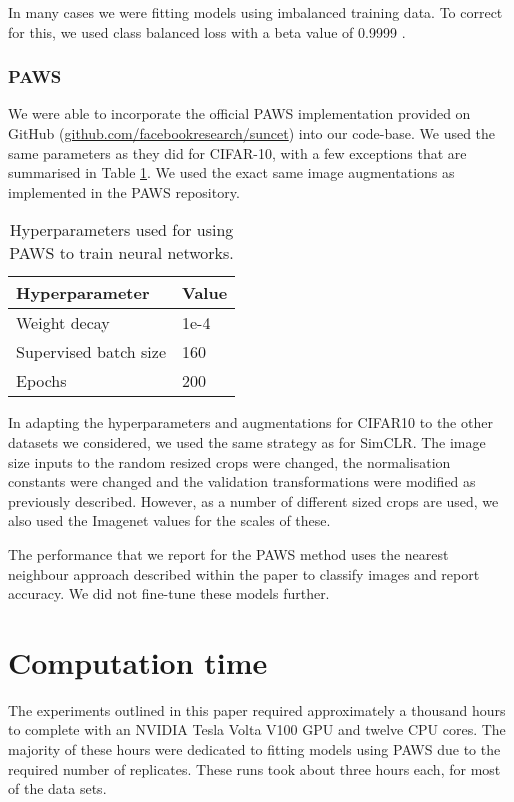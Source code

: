 \documentclass{article}
\begin{document}
In many cases we were fitting models using imbalanced training data. To correct for this, we used class balanced loss with a beta value of 0.9999 \citep{cui2019class}.

\subsubsection{PAWS}

We were able to incorporate the official PAWS \citep{assran2021semi} implementation provided on GitHub (\url{github.com/facebookresearch/suncet}) into our code-base. We used the same parameters as they did for CIFAR-10, with a few exceptions that are summarised in Table \ref{tbl:paws_cifar10_hyperparameters}. We used the exact same image augmentations as implemented in the PAWS repository.

\begin{table}[H]
\centering
\caption{Hyperparameters used for using PAWS to train neural networks.}
\label{tbl:paws_cifar10_hyperparameters}
 \begin{tabular}{m{6cm}  m{6cm}} 
 \hline
 Hyperparameter & Value \\
 \hline
 Weight decay & 1e-4 \\
 Supervised batch size & 160 \\ 
 Epochs & 200 \\
 \hline
 \end{tabular}
\end{table}

In adapting the hyperparameters and augmentations for CIFAR10 to the other datasets we considered, we used the same strategy as for SimCLR. The image size inputs to the random resized crops were changed, the normalisation constants were changed and the validation transformations were modified as previously described. However, as a number of different sized crops are used, we also used the Imagenet values for the scales of these.

The performance that we report for the PAWS method uses the nearest neighbour approach described within the paper \citep{assran2021semi} to classify images and report accuracy. We did not fine-tune these models further.

\section{Computation time}

The experiments outlined in this paper required approximately a thousand hours to complete with an NVIDIA Tesla Volta V100 GPU and twelve CPU cores. The majority of these hours were dedicated to fitting models using PAWS due to the required number of replicates. These runs took about three hours each, for most of the data sets.
\end{document}
